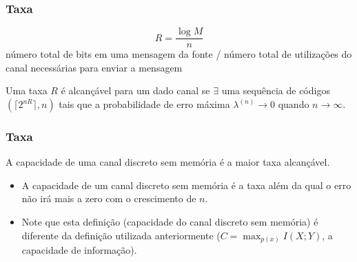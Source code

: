 \begin{frame}[allowframebreaks]
  \frametitle{Taxa}
  \begin{definition}
  \begin{equation}
  R = \frac{\log M}{n}  
  \end{equation}
  número total de bits em uma mensagem da fonte / número total de utilizações do canal necessárias para enviar a mensagem
  \end{definition}

  \begin{definition}
  Uma taxa $R$ é alcançável para um dado canal se $\exists$ uma sequência de códigos $(\lceil 2^{nR} \rceil , n)$ tais que
  a probabilidade de erro máxima $\lambda^{(n)} \rightarrow 0$ quando $n \rightarrow \infty$.
  \end{definition}

\end{frame}


\begin{frame}[allowframebreaks]
  \frametitle{Taxa}
  \begin{definition}
  A capacidade de uma canal discreto sem memória é a maior taxa alcançável.
  \end{definition}

  \begin{itemize}
  \item A capacidade de um canal discreto sem memória é a taxa além da qual o erro não irá mais a zero
	com o crescimento de $n$.
  \item Note que esta definição (capacidade do canal discreto sem memória) 
	é diferente da definição utilizada anteriormente ($C = \max_{p(x)} I(X;Y)$, 
	a capacidade de informação).
  \end{itemize}
\end{frame}



